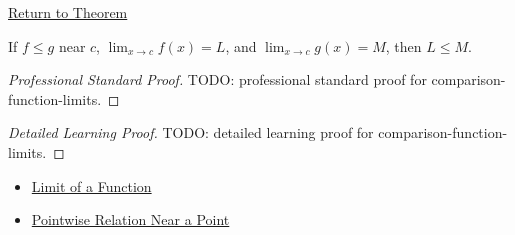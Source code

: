\newpage
{}
\label{prf:comparison-function-limits}

\begin{remark*}[Return]
\hyperref[thm:comparison-function-limits]{Return to Theorem}
\end{remark*}

\begin{theorem*}
If \(f\leq g\) near \(c\), \(\lim_{x\to c}f(x)=L\), and
\(\lim_{x\to c}g(x)=M\), then \(L\leq M\).
\end{theorem*}

\begin{proof}[Professional Standard Proof]
\LRAProofBodyStart
TODO: professional standard proof for comparison-function-limits.
\end{proof}

\begin{proof}[Detailed Learning Proof]
\LRAProofBodyStart
TODO: detailed learning proof for comparison-function-limits.
\end{proof}

\begin{remark*}
\end{remark*}

\begin{dependencies}
\begin{itemize}
  \item \hyperref[def:limit-function]{Limit of a Function}
  \item \hyperref[def:pointwise-relation-near-point]{Pointwise Relation Near a Point}
\end{itemize}
\end{dependencies}

\clearpage
